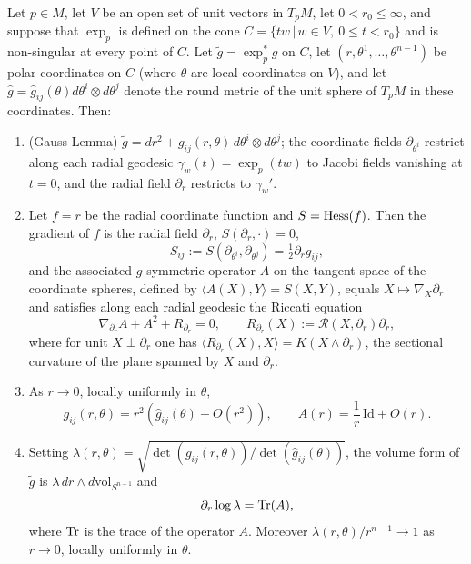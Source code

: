 \begin{lemma}
\label{lem:geodesic-polar-form}


Let $p\in M$, let $V$ be an open set of unit vectors in $T_pM$, let
$0<r_0\le\infty$, and suppose that $\exp_p$ is defined on the cone
$C=\{tw\,|\,w\in V,\ 0\le t<r_0\}$ and is non-singular at every
point of $C$. Let $\tilde g=\exp_p^*g$ on $C$, let
$(r,\theta^1,\ldots,\theta^{n-1})$ be polar coordinates on $C$
(where $\theta$ are local coordinates on $V$), and let $\hat
g=\hat g_{ij}(\theta)d\theta^i\otimes d\theta^j$ denote the round
metric of the unit sphere of $T_pM$ in these coordinates. Then:
\begin{enumerate}
\item (Gauss Lemma) $\tilde g=dr^2+g_{ij}(r,\theta)\,
d\theta^i\otimes d\theta^j$; the coordinate fields
$\partial_{\theta^i}$ restrict along each radial geodesic
$\gamma_w(t)=\exp_p(tw)$ to Jacobi fields vanishing at $t=0$, and
the radial field $\partial_r$ restricts to $\gamma_w'$.
\item Let $f=r$ be the radial coordinate function and
$S=\operatorname{Hess}(f)$. Then the gradient of $f$ is the radial field
$\partial_r$, $S(\partial_r,\cdot)=0$,
$$S_{ij}:=S(\partial_{\theta^i},\partial_{\theta^j})
=\tfrac{1}{2}\partial_rg_{ij},$$
and the associated $g$-symmetric operator $A$ on the tangent space
of the coordinate spheres, defined by $\langle
A(X),Y\rangle=S(X,Y)$, equals $X\mapsto\nabla_X\partial_r$ and
satisfies along each radial geodesic the Riccati equation
$$\nabla_{\partial_r}A+A^2+R_{\partial_r}=0,\qquad
R_{\partial_r}(X):={\mathcal R}(X,\partial_r)\partial_r,$$
where for unit $X\perp\partial_r$ one has $\langle
R_{\partial_r}(X),X\rangle=K(X\wedge\partial_r)$, the sectional
curvature of the plane spanned by $X$ and $\partial_r$.
\item As $r\to0$, locally uniformly in $\theta$,
$$g_{ij}(r,\theta)=r^2\left(\hat g_{ij}(\theta)+O(r^2)\right),
\qquad A(r)=\frac{1}{r}\,\mathrm{Id}+O(r).$$
\item Setting $\lambda(r,\theta)
=\sqrt{\det\left(g_{ij}(r,\theta)\right)/\det\left(\hat
g_{ij}(\theta)\right)}$, the volume form of $\tilde g$ is
$\lambda\, dr\wedge d\mathrm{vol}_{S^{n-1}}$ and
$$\partial_r\log\lambda=\operatorname{Tr}(A),$$
where $\operatorname{Tr}$ is the trace of the operator $A$. Moreover
$\lambda(r,\theta)/r^{n-1}\to 1$ as $r\to 0$, locally uniformly in
$\theta$.
\end{enumerate}
\end{lemma}

